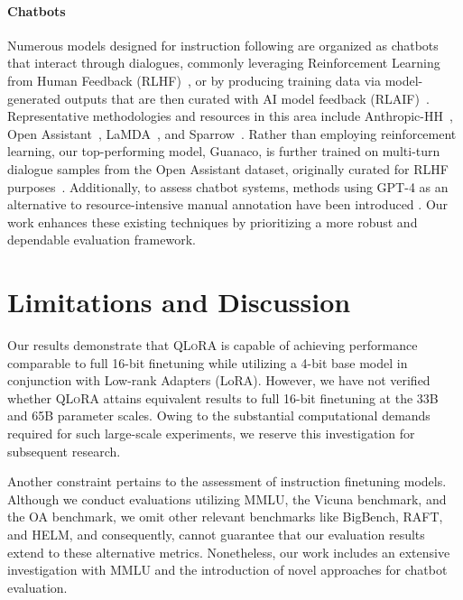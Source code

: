 \paragraph{Chatbots} Numerous models designed for instruction following are organized as chatbots that interact through dialogues, commonly leveraging Reinforcement Learning from Human Feedback (RLHF)~\citep{christiano2017deep}, or by producing training data via model-generated outputs that are then curated with AI model feedback (RLAIF)~\citep{bai2022constitutional}. Representative methodologies and resources in this area include Anthropic-HH~\citep{askell2021general,bai2022training}, Open Assistant~\citep{kopf2023openassistant}, LaMDA~\citep{thoppilan2022lamda}, and Sparrow~\citep{glaese2022improving}. Rather than employing reinforcement learning, our top-performing model, Guanaco, is further trained on multi-turn dialogue samples from the Open Assistant dataset, originally curated for RLHF purposes~\citep{kopf2023openassistant}. Additionally, to assess chatbot systems, methods using GPT-4 as an alternative to resource-intensive manual annotation have been introduced \citep{vicuna2023,peng2023instruction}. Our work enhances these existing techniques by prioritizing a more robust and dependable evaluation framework.

\section{Limitations and Discussion}

Our results demonstrate that \textsc{QLoRA} is capable of achieving performance comparable to full 16-bit finetuning while utilizing a 4-bit base model in conjunction with Low-rank Adapters (LoRA). However, we have not verified whether \textsc{QLoRA} attains equivalent results to full 16-bit finetuning at the 33B and 65B parameter scales. Owing to the substantial computational demands required for such large-scale experiments, we reserve this investigation for subsequent research.

Another constraint pertains to the assessment of instruction finetuning models. Although we conduct evaluations utilizing MMLU, the Vicuna benchmark, and the OA benchmark, we omit other relevant benchmarks like BigBench, RAFT, and HELM, and consequently, cannot guarantee that our evaluation results extend to these alternative metrics. Nonetheless, our work includes an extensive investigation with MMLU and the introduction of novel approaches for chatbot evaluation.

